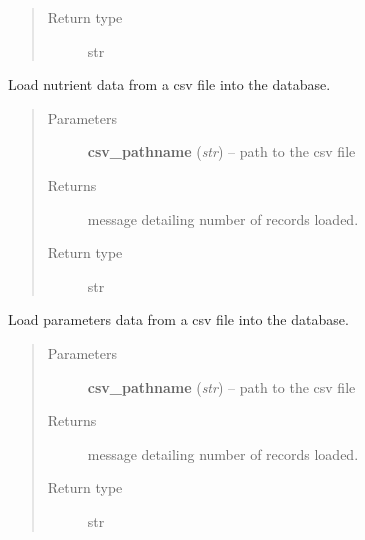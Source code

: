 \documentclass[letterpaper,10pt,english]{sphinxmanual}
\begin{document}
\begin{fulllineitems}
\begin{fulllineitems}
\begin{quote}
\begin{description}
\item[{Return type}] \leavevmode
str

\end{description}\end{quote}

\end{fulllineitems}


\begin{fulllineitems}
\label{modules:webb_utils.upload_data.UploadData.load_nutrient_data}
Load nutrient data from a csv file into the database.
\begin{quote}\begin{description}
\item[{Parameters}] \leavevmode
\textbf{csv\_pathname} (\emph{str}) -- path to the csv file

\item[{Returns}] \leavevmode
message detailing number of records loaded.

\item[{Return type}] \leavevmode
str

\end{description}\end{quote}

\end{fulllineitems}


\begin{fulllineitems}
\label{modules:webb_utils.upload_data.UploadData.load_parameters}
Load parameters data from a csv file into the database.
\begin{quote}\begin{description}
\item[{Parameters}] \leavevmode
\textbf{csv\_pathname} (\emph{str}) -- path to the csv file

\item[{Returns}] \leavevmode
message detailing number of records loaded.

\item[{Return type}] \leavevmode
str

\end{description}\end{quote}


\end{fulllineitems}
\end{fulllineitems}
\end{document}
